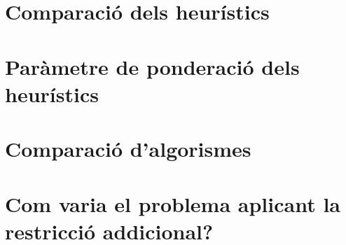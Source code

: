 \section{Comparació dels heurístics} %
\label{sec:comph1h2}



\newpage %
\section{Paràmetre de ponderació dels heurístics} %
\label{sec:expkh}



\newpage
\section{Comparació d'algorismes} %
\label{sec:comparacioalg}



\newpage
\section{Com varia el problema aplicant la restricció addicional?} %
\label{sec:restadd}


